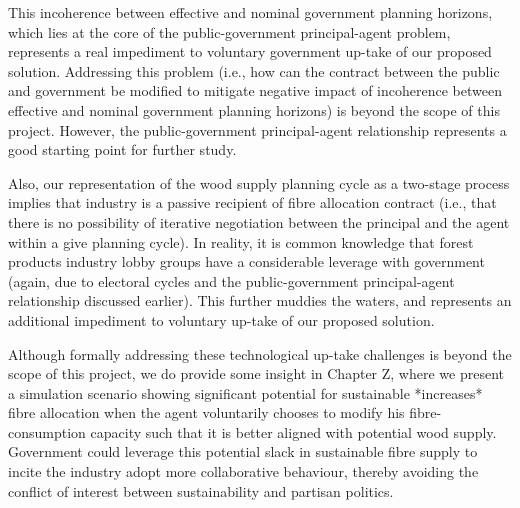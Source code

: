 This incoherence between effective and nominal government planning horizons, which lies at the core of the public-government principal-agent problem, represents a real impediment to voluntary government up-take of our proposed solution. Addressing this problem (i.e., how can the contract between the public and government be modified to mitigate negative impact of incoherence between effective and nominal government planning horizons) is beyond the scope of this project. However, the public-government principal-agent relationship represents a good starting point for further study.

Also, our representation of the wood supply planning cycle as a two-stage process implies that industry is a passive recipient of fibre allocation contract (i.e., that there is no possibility of iterative negotiation between the principal and the agent within a give planning cycle). In reality, it is common knowledge that forest products industry lobby groups have a considerable leverage with government (again, due to electoral cycles and the public-government principal-agent relationship discussed earlier). This further muddies the waters, and represents an additional impediment to voluntary up-take of our proposed solution.  

Although formally addressing these technological up-take challenges is beyond the scope of this project, we do provide some insight in Chapter Z, where we present a simulation scenario showing significant potential for sustainable *increases* fibre allocation when the agent voluntarily chooses to modify his fibre-consumption capacity such that it is better aligned with potential wood supply. Government could leverage this potential slack in sustainable fibre supply to incite the industry adopt more collaborative behaviour, thereby avoiding the conflict of interest between sustainability and partisan politics.  
